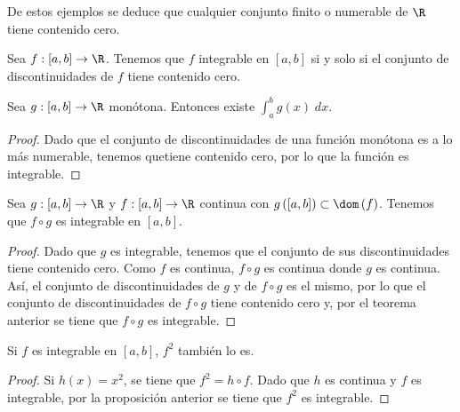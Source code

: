 \begin{observation}
\normalfont De estos ejemplos se deduce que cualquier conjunto finito o numerable de $\displaystyle \R $ tiene contenido cero.
\end{observation}
\begin{ftheorem}
	\normalfont Sea $\displaystyle f : \left[a,b\right] \to \R $. Tenemos que $\displaystyle f $ integrable en $\displaystyle \left[a,b\right]  $ si y solo si el conjunto de discontinuidades de $\displaystyle f $ tiene contenido cero.
\end{ftheorem}
\begin{fprop}[]
	\normalfont Sea $\displaystyle g : \left[a,b\right] \to \R $ monótona. Entonces existe $\displaystyle \int^{b}_{a} g\left(x\right) \; dx $.
\end{fprop}
\begin{proof}
Dado que el conjunto de discontinuidades de una función monótona es a lo más numerable, tenemos quetiene contenido cero, por lo que la función es integrable.
\end{proof}
\begin{ftheorem}[]
	\normalfont Sea $\displaystyle g : \left[a,b\right] \to \R $ y $\displaystyle f : \left[a,b\right] \to \R $ continua con $\displaystyle g\left(\left[a,b\right] \right)\subset \dom\left(f\right) $. Tenemos que $\displaystyle f \circ g $ es integrable en $\displaystyle \left[a,b\right]  $.
\end{ftheorem}
\begin{proof}
Dado que $\displaystyle g $ es integrable, tenemos que el conjunto de sus discontinuidades tiene contenido cero. Como $\displaystyle f $ es continua, $\displaystyle f \circ g $ es continua donde $\displaystyle g $ es continua. Así, el conjunto de discontinuidades de $\displaystyle g $ y de $\displaystyle f\circ g $ es el mismo, por lo que el conjunto de discontinuidades de $\displaystyle f \circ g $ tiene contenido cero y, por el teorema anterior se tiene que $\displaystyle f \circ g $ es integrable.
\end{proof}
\begin{fcolorary}[]
	\normalfont Si $\displaystyle f $ es integrable en $\displaystyle \left[a,b\right]  $, $\displaystyle f^{2} $ también lo es.
\end{fcolorary}
\begin{proof}
Si $\displaystyle h\left(x\right) = x^{2} $, se tiene que $\displaystyle f^{2} = h\circ f $. Dado que $\displaystyle h $ es continua y $\displaystyle f $ es integrable, por la proposición anterior se tiene que $\displaystyle f^{2} $ es integrable.
\end{proof}
